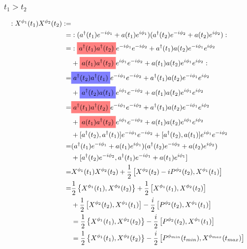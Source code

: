 \documentclass[12pt]{article}
\newcommand{\highlightr}[1]{%
  \colorbox{red!50}{$\displaystyle#1$}}
\newcommand{\highlightb}[1]{%
  \colorbox{blue!50}{$\displaystyle#1$}}
\begin{document}
\subsubsection{$t_1>t_2$}
\begin{align}
:X^{\phi_1}(t_1)X^{\phi_2}(t_2): =&\\
=& :(a^{\dag}(t_1)e^{-i\phi_1} + a(t_1)e^{i\phi_1})(a^{\dag}(t_2)e^{-i\phi_2} + a(t_2)e^{i\phi_2}):\\
=& :\highlightr{a^{\dag}(t_1)a^{\dag}(t_2)}e^{-i\phi_1}e^{-i\phi_2} + a^{\dag}(t_1)a(t_2)e^{-i\phi_1}e^{i\phi_2}\\
&+ \highlightr{a(t_1)a^{\dag}(t_2)}e^{i\phi_1}e^{-i\phi_2} + a(t_1)a(t_2)e^{i\phi_1}e^{i\phi_2}:\\
=& \highlightb{a^{\dag}(t_2)a^{\dag}(t_1)}e^{-i\phi_1}e^{-i\phi_2} + a^{\dag}(t_1)a(t_2)e^{-i\phi_1}e^{i\phi_2}\\
&+ \highlightb{a^{\dag}(t_2)a(t_1)}e^{i\phi_1}e^{-i\phi_2} + a(t_1)a(t_2)e^{i\phi_1}e^{i\phi_2}\\
=& \highlightr{a^{\dag}(t_1)a^{\dag}(t_2)}e^{-i\phi_1}e^{-i\phi_2} + a^{\dag}(t_1)a(t_2)e^{-i\phi_1}e^{i\phi_2}\\
&+ \highlightr{a(t_1)a^{\dag}(t_2)}e^{i\phi_1}e^{-i\phi_2} + a(t_1)a(t_2)e^{i\phi_1}e^{i\phi_2}\\
&+ [a^{\dag}(t_2), a^{\dag}(t_1)]e^{-i\phi_1}e^{-i\phi_2} + [a^{\dag}(t_2), a(t_1)]e^{i\phi_1}e^{-i\phi_2}\\
=& (a^{\dag}(t_1)e^{-i\phi_1} + a(t_1)e^{i\phi_1})(a^{\dag}(t_2)e^{-i\phi_2} + a(t_2)e^{i\phi_2})\\
&+ [a^{\dag}(t_2)e^{-i\phi_2}, a^{\dag}(t_1)e^{-i\phi_1} + a(t_1)e^{i\phi_1}]\\
=& X^{\phi_1}(t_1)X^{\phi_2}(t_2) + \frac{1}{2}\left[X^{\phi_2}(t_2) - iP^{\phi_2}(t_2), X^{\phi_1}(t_1)\right]\\
=& \frac{1}{2}\left\{X^{\phi_1}(t_1), X^{\phi_2}(t_2)\right\} + \frac{1}{2}\left[X^{\phi_1}(t_1), X^{\phi_2}(t_2)\right]\\
&+\frac{1}{2}\left[X^{\phi_2}(t_2), X^{\phi_1}(t_1)\right] - \frac{i}{2}\left[P^{\phi_2}(t_2), X^{\phi_1}(t_1)\right]\\
&= \frac{1}{2}\left\{X^{\phi_1}(t_1), X^{\phi_2}(t_2)\right\} - \frac{i}{2}\left[P^{\phi_2}(t_2), X^{\phi_1}(t_1)\right]\\
&= \frac{1}{2}\left\{X^{\phi_1}(t_1), X^{\phi_2}(t_2)\right\} - \frac{i}{2}\left[P^{\phi_{min}}(t_{min}), X^{\phi_{max}}(t_{max})\right]\\
\end{align}
\end{document}

